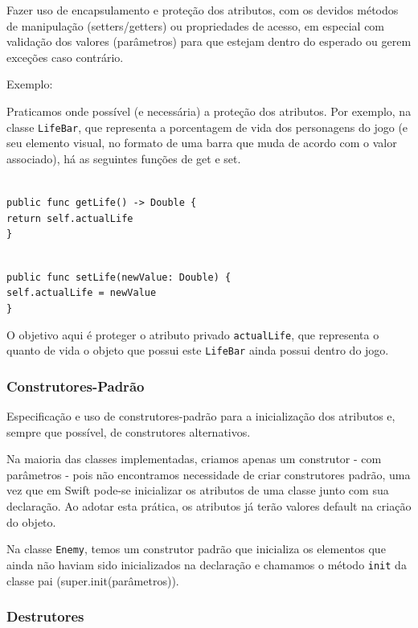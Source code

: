 \documentclass[rel_mlp]{iiufrgs}
\newcommand\tab[1][1cm]{\hspace*{#1}}
\begin{document}
Fazer uso de encapsulamento e proteção dos atributos, com os devidos métodos de manipulação (setters/getters) ou propriedades de acesso, em especial com validação dos valores (parâmetros) para que estejam dentro do esperado ou gerem exceções caso contrário.

Exemplo:

Praticamos onde possível (e necessária) a proteção dos atributos. Por exemplo, na classe \texttt{LifeBar}, que representa a porcentagem de vida dos personagens do jogo (e seu elemento visual, no formato de uma barra que muda de acordo com o valor associado), há as seguintes funções de get e set.

\texttt{\\public func getLife() -> Double \{\\\tab return self.actualLife\\\}}

\texttt{\\public func setLife(newValue: Double) \{\\\tab self.actualLife = newValue\\\}}
    
O objetivo aqui é proteger o atributo privado \texttt{actualLife}, que representa o quanto de vida o objeto que possui este \texttt{LifeBar} ainda possui dentro do jogo.


\subsubsection{Construtores-Padrão}

Especificação e uso de construtores-padrão para a inicialização dos atributos e, sempre que possível, de construtores alternativos.

Na maioria das classes implementadas, criamos apenas um construtor - com parâmetros - pois não encontramos necessidade de criar construtores padrão, uma vez que em Swift pode-se inicializar os atributos de uma classe junto com sua declaração. Ao adotar esta prática, os atributos já terão valores default na criação do objeto.

Na classe \texttt{Enemy}, temos um construtor padrão que inicializa os elementos que ainda não haviam sido inicializados na declaração e chamamos o método \texttt{init} da classe pai (super.init(parâmetros)).


\subsubsection{Destrutores}
\end{document}

